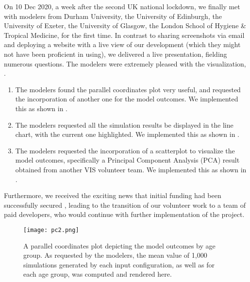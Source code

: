 On 10 Dec 2020, a week after the second UK national lockdown, we finally met with modelers from Durham University, the University of Edinburgh, the University of Exeter, the University of Glasgow, the London School of Hygiene \& Tropical Medicine, for the first time.
In contrast to sharing screenshots via email and deploying a website with a live view of our development (which they might not have been proficient in using), we delivered a live presentation, fielding numerous questions.
The modelers were extremely pleased with the visualization, .
\begin{enumerate}
    \item The modelers found the parallel coordinates plot very useful, and requested the incorporation of another one for the model outcomes.  We implemented this as shown in .
    \item The modelers requested all the simulation results be displayed in the line chart, with the current one highlighted.  We implemented this as shown in .
    \item The modelers requested the incorporation of a scatterplot to visualize the model outcomes, specifically a Principal Component Analysis (PCA) result obtained from another VIS volunteer team.  We implemented this as shown in .
\end{enumerate}

Furthermore, we received the exciting news that initial funding had been successfully secured \cite{engineering&physicalsciencesresearchcouncil2021RAMP}, leading to the transition of our volunteer work to a team of paid developers, who would continue with further implementation of the project.

\begin{figure}[tb!]
    \centering
    \texttt{[image: pc2.png]}
    \caption{A parallel coordinates plot depicting the model outcomes by age group. As requested by the modelers, the mean value of 1,000 simulations generated by each input configuration, as well as for each age group, was computed and rendered here. 
    }
    \label{fig:pc2}

\end{figure}

